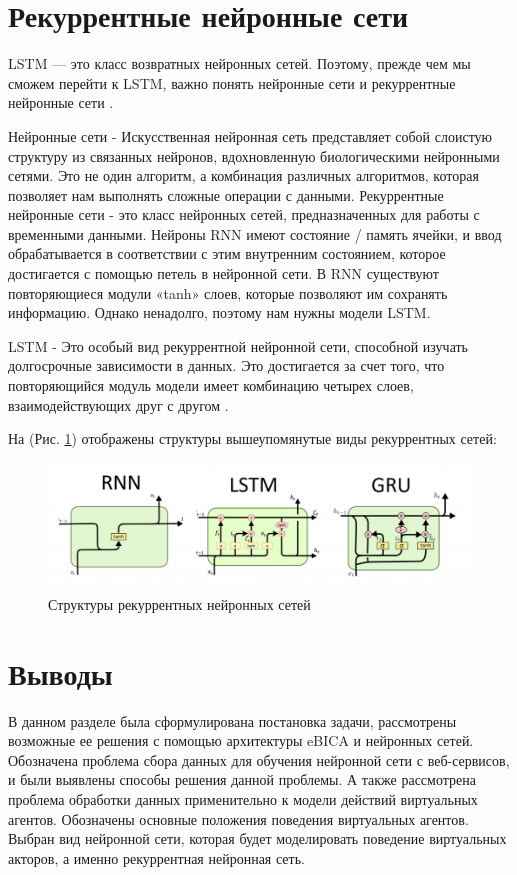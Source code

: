 \section{Рекуррентные нейронные сети}

LSTM — это класс возвратных нейронных сетей. Поэтому, прежде чем мы сможем перейти к LSTM, 
важно понять нейронные сети и рекуррентные нейронные сети \cite{Wikipedia01}. 

Нейронные сети - Искусственная нейронная сеть представляет собой слоистую структуру из связанных нейронов,
вдохновленную биологическими нейронными сетями. Это не один алгоритм, а комбинация различных алгоритмов, 
которая позволяет нам выполнять сложные операции с данными. 
Рекуррентные нейронные сети - это класс нейронных сетей, предназначенных для работы с временными данными. 
Нейроны RNN имеют состояние / память ячейки, и ввод обрабатывается в соответствии 
с этим внутренним состоянием, которое достигается с помощью петель в нейронной сети. 
В RNN существуют повторяющиеся модули «tanh» слоев, которые позволяют им сохранять информацию. 
Однако ненадолго, поэтому нам нужны модели LSTM. 

LSTM - Это особый вид рекуррентной нейронной сети, способной изучать долгосрочные зависимости в данных. 
Это достигается за счет того, что повторяющийся модуль модели имеет комбинацию четырех слоев, взаимодействующих друг с другом \cite{Wikipedia01}. 

На (Рис. \ref{pic:ris9}) отображены структуры вышеупомянутые виды рекуррентных сетей: 

\begin{figure}[h]
\includegraphics[width=0.75\columnwidth]{./img/ris9.png}
\centering
\caption{Структуры рекуррентных нейронных сетей}
\label{pic:ris9}
\end{figure}

\section{Выводы}

В данном разделе была сформулирована постановка задачи, рассмотрены возможные ее решения с помощью архитектуры eBICA и нейронных сетей. 
Обозначена проблема сбора данных для обучения нейронной сети с веб-сервисов, и были выявлены способы решения данной проблемы. 
А также рассмотрена проблема обработки данных применительно к модели действий виртуальных агентов. Обозначены основные положения 
поведения виртуальных агентов. Выбран вид нейронной сети, которая будет моделировать поведение виртуальных акторов, а именно 
рекуррентная нейронная сеть.
